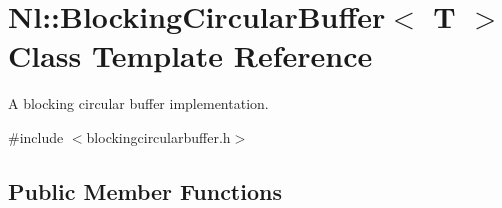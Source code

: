 \hypertarget{classNl_1_1BlockingCircularBuffer}{\section{Nl\-:\-:Blocking\-Circular\-Buffer$<$ T $>$ Class Template Reference}
\label{classNl_1_1BlockingCircularBuffer}
}


A blocking circular buffer implementation.  




{\ttfamily \#include $<$blockingcircularbuffer.\-h$>$}

\subsection*{Public Member Functions}
